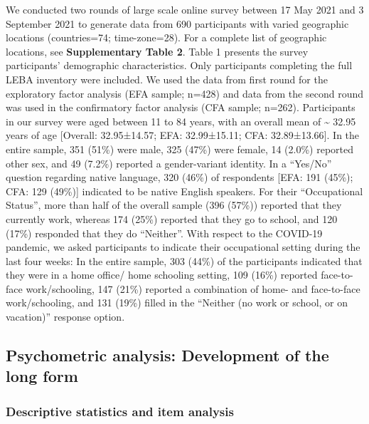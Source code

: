 \documentclass[
  man]{apa6}
\begin{document}
We conducted two rounds of large scale online survey between 17 May 2021 and 3 September 2021 to generate data from 690 participants with varied geographic locations (countries=74; time-zone=28). For a complete list of geographic locations, see \textbf{Supplementary Table 2}. Table 1 presents the survey participants' demographic characteristics. Only participants completing the full LEBA inventory were included. We used the data from first round for the exploratory factor analysis (EFA sample; n=428) and data from the second round was used in the confirmatory factor analysis (CFA sample; n=262). Participants in our survey were aged between 11 to 84 years, with an overall mean of \textasciitilde{} 32.95 years of age {[}Overall: 32.95±14.57; EFA: 32.99±15.11; CFA: 32.89±13.66{]}. In the entire sample, 351 (51\%) were male, 325 (47\%) were female, 14 (2.0\%) reported other sex, and 49 (7.2\%) reported a gender-variant identity. In a ``Yes/No'' question regarding native language, 320 (46\%) of respondents {[}EFA: 191 (45\%); CFA: 129 (49\%){]} indicated to be native English speakers. For their ``Occupational Status'', more than half of the overall sample (396 (57\%)) reported that they currently work, whereas 174 (25\%) reported that they go to school, and 120 (17\%) responded that they do ``Neither''. With respect to the COVID-19 pandemic, we asked participants to indicate their occupational setting during the last four weeks: In the entire sample, 303 (44\%) of the participants indicated that they were in a home office/ home schooling setting, 109 (16\%) reported face-to-face work/schooling, 147 (21\%) reported a combination of home- and face-to-face work/schooling, and 131 (19\%) filled in the ``Neither (no work or school, or on vacation)'' response option.

\hypertarget{psychometric-analysis-development-of-the-long-form}{%
\subsection{Psychometric analysis: Development of the long form}\label{psychometric-analysis-development-of-the-long-form}}

\hypertarget{descriptive-statistics-and-item-analysis}{%
\subsubsection{Descriptive statistics and item analysis}\label{descriptive-statistics-and-item-analysis}}
\end{document}
